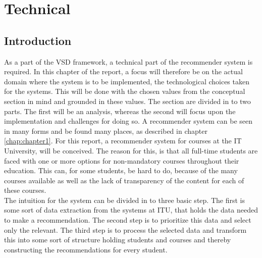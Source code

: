 
 
\section{Technical}



\subsection{Introduction}
As a part of the VSD framework, a technical part of the recommender system is required. In this chapter of the report, a focus will therefore be on the actual domain where the system is to be implemented, the technological choices taken for the systems. This will be done with the chosen values from the conceptual section in mind and grounded in these values. 
The section are divided in to two parts. The first will be an analysis, whereas the second will focus upon the implementation and challenges for doing so. 
A recommender system can be seen in many forms and be found many places, as described in chapter \ref{chap:chapter1}. For this report, a recommender system for courses at the IT University, will be conceived. The reason for this, is that all full-time students are faced with one or more options for non-mandatory courses throughout their education. This can, for some students, be hard to do, because of the many courses available as well as the lack of transparency of the content for each of these courses.\\

The intuition for the system can be divided in to three basic step. The first is some sort of data extraction from the systems at ITU, that holds the data needed to make a recommendation. The second step is to prioritize this data and select only the relevant. The third step is to process the selected data and transform this into some sort of structure holding students and courses and thereby constructing the recommendations for every student.


